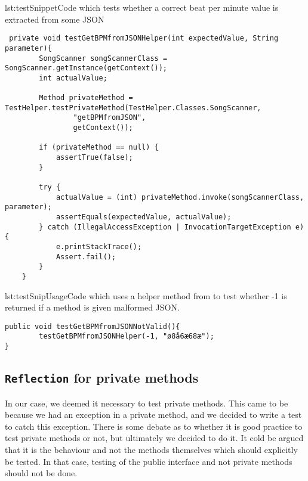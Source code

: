 \begin{code}{lst:testSnippet}{Code which tests whether a correct beat per minute value is extracted from some JSON}
\begin{lstlisting}
 private void testGetBPMfromJSONHelper(int expectedValue, String parameter){
        SongScanner songScannerClass = SongScanner.getInstance(getContext());
        int actualValue;

        Method privateMethod = TestHelper.testPrivateMethod(TestHelper.Classes.SongScanner,
                "getBPMfromJSON",
                getContext());

        if (privateMethod == null) {
            assertTrue(false);
        }

        try {
            actualValue = (int) privateMethod.invoke(songScannerClass, parameter);
            assertEquals(expectedValue, actualValue);
        } catch (IllegalAccessException | InvocationTargetException e) {
            e.printStackTrace();
            Assert.fail();
        }
    }
\end{lstlisting}
\end{code}
\begin{code}{lst:testSnipUsage}{Code which uses a helper method from  to test whether -1 is returned if a method is given malformed JSON.}
\begin{lstlisting}
public void testGetBPMfromJSONNotValid(){
        testGetBPMfromJSONHelper(-1, "ø8å6æ68æ");
}
\end{lstlisting}
\end{code}

\subsection{\texttt{Reflection} for private methods}\label{sec:privTest}
In our case, we deemed it necessary to test private methods. This came to be because we had an exception in a private method, and we decided to write a test to catch this exception. There is some debate as to whether it is good practice to test private methods or not, but ultimately we decided to do it. It cold be argued that it is the behaviour and not the methods themselves which should explicitly be tested. In that case, testing of the public interface and not private methods should not be done.
% 